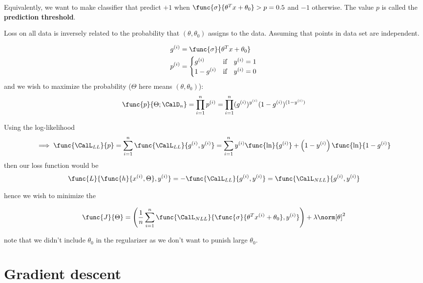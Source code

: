 Equivalently, we want to make classifier that predict \(+1\) when \(\func{\sigma}{\theta^T x+ \theta_0} > p = 0.5\) and \(-1\) otherwise. The value \(p\) is called the \textbf{prediction threshold}.

Loss on all data is inversely related to the probability that \((\theta , \theta_0)\) assigns to the data. Assuming that points in data set are independent.

\begin{align*}
    g^{(i)} & =  \func{\sigma}{\theta^T x + \theta_0} \\
    p^{(i)} & = \begin{cases}
        g^{(i)}     & \text{if} \quad y^{(i)} = 1 \\
        1 - g^{(i)} & \text{if} \quad y^{(i)} = 0 \\
    \end{cases}
\end{align*}
and we wish to maximize the probability (\(\Theta\) here means \((\theta, \theta_0)\)):
\begin{equation*}
    \func{p}{\Theta ; \CalD_n} = \prod_{i = 1}^n p^{(i)} = \prod_{i = 1}^n (g^{(i)})^{y^{(i)}} ( 1 - g^{(i)})^{(1 - y^{(i)})}                   \\
\end{equation*}

Using the log-likelihood
\begin{equation*}
    \implies \func{\CalL_{LL}}{p} = \sum_{i = 1}^n \func{\CalL_{LL}}{g^{(i)} , y^{(i)}} =\sum_{i = 1}^n  y^{(i)} \func{\ln}{g^{(i)}} + \left(1 - y^{(i)} \right) \func{\ln}{ 1 - g^{(i)}} 
\end{equation*}
then our loss function would be
\begin{equation*}
    \func{L}{\func{h}{x^{(i)}, \Theta} , y^{(i)}} = - \func{\CalL_{LL}}{g^{(i)} , y^{(i)}} =\func{\CalL_{NLL}}{g^{(i)} , y^{(i)}} 
\end{equation*}

hence we wish to minimize the 

\begin{equation*}
    \func{J}{\Theta}  = \left(\dfrac{1}{n} \sum_{i = 1}^n \func{\CalL_{NLL}}{ \func{\sigma}{\theta^T x^{(i)} + \theta_0} , y^{(i)}} \right) + \lambda \norm[\theta]^2
\end{equation*}

note that we didn't include \(\theta_0\) in the regularizer as we don't want to punish large \(\theta_0\). 

\section{Gradient descent}
